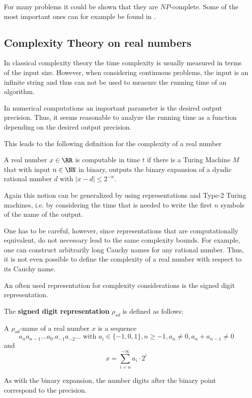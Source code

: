     For many problems it could be shown that they are $NP$-complete. 
    Some of the most important ones can for example be found in
    \cite{garey1979}.
	\subsection{Complexity Theory on real numbers}
		In classical complexity theory the time complexity is usually measured in terms of the input size.
		However, when considering continuous problems, the input is an infinite string and thus can not 
		be used to measure the running time of an algorithm.

		In numerical computations an important parameter is the desired output precision.
		Thus, it seems reasonable to analyze the running time as a function depending on the desired output precision.
    
		This leads to the following definition for the complexity of a real
    number
		\begin{definition}\label{def:complexity_real_number}
			A real number $x \in \RR$ is computable in time $t$ if there is a Turing Machine $M$ that with input $n \in \NN$ in binary, 
			outputs the binary expansion of a dyadic rational number $d$ with $| x - d | \leq 2^{-n}$.  
		\end{definition}
		Again this notion can be generalized by using representations and Type-2
    Turing machines, i.e. by considering the time that is needed to write the first $n$ symbols
		of the name of the output.
      
    One has to be careful, however, since representations that are
    computationally equivalent, do not necessary lead to the same complexity
    bounds.  
    For example, one can construct arbitrarily long Cauchy names for
    any rational number.
    Thus, it is not even possible to define the complexity of a real number
    with respect to its Cauchy name.

		An often used representation for complexity considerations is the signed
    digit representation.
		\begin{definition}
			The \textbf{signed digit representation} $\rho_{sd}$ is defined as follows: 

      A $\rho_{sd}$-name of a real number $x$ is a sequence 
			$$a_n a_{n-1} \dots a_0 . a_{-1} a_{-2} \dots \text{ with } a_i \in \{-1,0,1\}, n \geq -1, a_n \neq 0, a_n + a_{n-1} \neq 0$$
      and
			$$  x = \sum_{i=n}^{-\infty} a_i \cdot 2^i $$  
		\end{definition}
		As with the binary expansion, the number digits after the binary point correspond to the precision.

